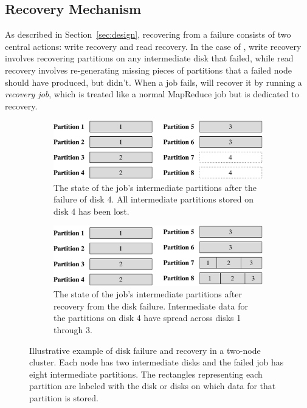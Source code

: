 \subsection{Recovery Mechanism}
\label{sec:recovery}

As described in Section~\ref{sec:design}, recovering from a failure consists of
two central actions: write recovery and read recovery. In the case of \themis,
write recovery involves recovering partitions on any intermediate disk that
failed, while read recovery involves re-generating missing pieces of partitions
that a failed node should have produced, but didn't. When a job fails, \themis
will recover it by running a \emph{recovery job}, which is treated like a
normal MapReduce job but is dedicated to recovery.

\begin{figure}
  \centering
  \begin{subfigure}[t]{\columnwidth}
    \centering
    \includegraphics[width=\textwidth]{fault_tolerance/figures/disk_failure_before_recovery}
    \caption{\label{fig:disk_fail_before} The state of the job's intermediate
      partitions after the failure of disk 4. All intermediate partitions
      stored on disk 4 has been lost.}
  \end{subfigure}\hspace{0.05\textwidth}
  \begin{subfigure}[t]{\columnwidth}
    \centering
    \includegraphics[width=\textwidth]{fault_tolerance/figures/disk_failure_after_recovery}
    \caption{\label{fig:disk_fail_after} The state of the job's intermediate
      partitions after recovery from the disk failure. Intermediate data for
      the partitions on disk 4 have spread across disks 1 through 3.}
  \end{subfigure}
  \caption{\label{fig:disk_fail} Illustrative example of disk failure and
    recovery in a two-node cluster. Each node has two intermediate disks and
    the failed job has eight intermediate partitions. The rectangles
    representing each partition are labeled with the disk or disks on which
    data for that partition is stored.}
\end{figure}

